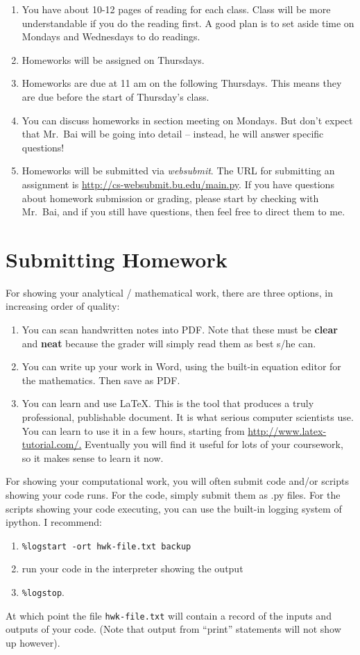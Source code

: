 \documentclass[11pt]{article}
\begin{document}
\begin{enumerate}
\item  You have about 10-12 pages of reading for each class.   Class will be
more understandable if you do the reading first.   A good plan is to set aside
time on Mondays and Wednesdays to do readings.
\item  Homeworks will be assigned on Thursdays.
\item Homeworks are due at 11 am on the following Thursdays.  This means they are due
before the start of Thursday's class.
\item You can discuss homeworks in section meeting on Mondays.   But don't
expect that Mr.\ Bai will be going into detail -- instead, he will
answer specific questions!
\item Homeworks will be submitted via \emph{websubmit}.   The URL for
  submitting an assignment is \url{http://cs-websubmit.bu.edu/main.py}.
  If you have questions about homework submission or grading, please start by checking
  with Mr.\ Bai, and if you still have questions, then feel free to direct them to me.
\end{enumerate}

\section*{Submitting Homework}
For showing your analytical / mathematical work, there are three
options, in increasing order of quality:
\begin{enumerate}
\item You can scan handwritten notes into PDF.    Note that these must
  be \textbf{clear} and \textbf{neat} because the grader will simply
  read them as best s/he can.
\item You can write up your work in Word, using the built-in equation
  editor for the mathematics.   Then save as PDF.   
\item You can learn and use \LaTeX.   This is the tool that produces a
  truly professional, publishable document.   It is what serious
  computer scientists use.  You can learn to use it in a few hours,
  starting from \url{http://www.latex-tutorial.com/.}   Eventually you will
  find it useful for lots of your coursework, so it makes sense to learn it
  now. 
\end{enumerate}

For showing your computational work, you will often submit code 
and/or scripts showing your code runs.   For the code, simply
submit them as .py files.   For the scripts showing your code executing,
you can use the built-in logging system of ipython.   I recommend: 
\begin{enumerate}
\item \verb$%logstart -ort hwk-file.txt backup$
\item run your code in the interpreter showing the output
\item \verb$%logstop$.
\end{enumerate}
At which point the file \texttt{hwk-file.txt} will contain a record of
the inputs and outputs of your code.   (Note that output from ``print'' statements
will not show up however). 
\end{document}

